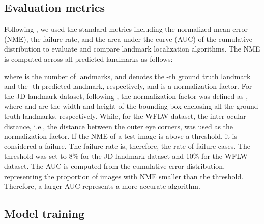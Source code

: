 \documentclass[journal]{IEEEtran}
\begin{document}
\subsection{Evaluation metrics}\label{subsec:metrics}

Following \cite{Wang2019c, Kumar2020, xiong2020, earp2021sub}, we used the standard metrics including the normalized mean error (NME), the failure rate, and the area under the curve (AUC) of the cumulative distribution to evaluate and compare landmark localization algorithms.
The NME is computed across all predicted landmarks as follows:

where  is the number of landmarks,  and  denotes the -th ground truth landmark and the -th predicted landmark, respectively, and  is a normalization factor. 
For the JD-landmark dataset, following \cite{liu2019}, the normalization factor  was defined as , where  and  are the width and height of the bounding box enclosing all the ground truth landmarks, respectively. 
While, for the WFLW dataset, the inter-ocular distance, i.e., the distance between the outer eye corners, was used as the normalization factor.
If the NME of a test image is above a threshold, it is considered a failure.
The failure rate is, therefore, the rate of failure cases. 
The threshold was set to 8\% for the JD-landmark dataset and 10\% for the WFLW dataset.
The AUC is computed from the cumulative error distribution, representing the proportion of images with NME smaller than the threshold.
Therefore, a larger AUC represents a more accurate algorithm. 



\subsection{Model training}\label{subsec:training}
\end{document}

